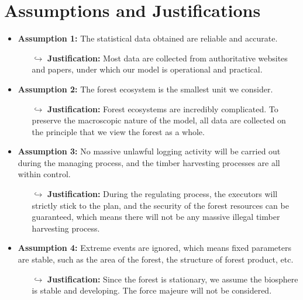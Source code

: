 \section{Assumptions and Justifications}
\begin{comment}
To simplify the problem, the following assumptions are made and justified.
\end{comment}

\begin{itemize}
  \item \textbf{Assumption 1:} The statistical data obtained are reliable and accurate.
	\begin{itemize}
  	 \item[$\hookrightarrow$] \textbf{Justification:} Most data are collected from authoritative websites and papers, under which our model is operational and practical.
 	\end{itemize}
  \item \textbf{Assumption 2:} The forest ecosystem is the smallest unit we consider.
        \begin{itemize} 
          \item[$\hookrightarrow$] \textbf{Justification:} Forest ecosystems are incredibly complicated. To preserve the macroscopic nature of the model, all data are collected on the principle that we view the forest as a whole.
        \end{itemize}
  \item \textbf{Assumption 3:} No massive unlawful logging activity will be carried out during the managing process, and the timber harvesting processes are all within control.
        \begin{itemize}
          \item[$\hookrightarrow$] \textbf{Justification:} During the regulating process, the executors will strictly stick to the plan, and the security of the forest resources can be guaranteed, which means there will not be any massive illegal timber harvesting process.
        \end{itemize}
  \item \textbf{Assumption 4:} Extreme events are ignored, which means fixed parameters are stable, such as the area of the forest, the structure of forest product, etc.
        \begin{itemize}
          \item[$\hookrightarrow$] \textbf{Justification:} Since the forest is stationary, we assume the biosphere is stable and developing. The force majeure will not be considered. 
        \end{itemize}
\end{itemize}